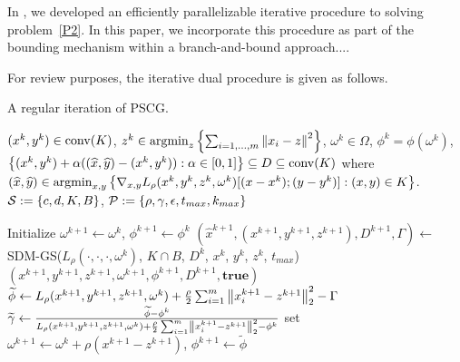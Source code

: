 In \cite{previouspaper}, we developed an efficiently parallelizable iterative procedure to solving problem~\eqref{P2}. 
In this paper, we incorporate this procedure as part of the bounding mechanism within a branch-and-bound approach....

For review purposes, the iterative dual procedure is given as follows.

\begin{algorithm}[H]
\caption{A regular iteration of PSCG.\label{AlgDualAscentGSSSC}}
\begin{algorithmic}
\State \quad\quad$(x^k,y^k) \in \operatorname{conv}(K)$, $z^k \in \operatorname*{argmin}_z \left\{ \sum_{i=1,\dots,m}\left \| x_i-z \right \|^2 \right \}$, $\omega^k \in \Omega$, 
\State \quad\quad${\phi}^k = {\phi}(\omega^k)$, $\left\{ (x^k,y^k) + \alpha ((\widehat{x},\widehat{y}) - (x^k,y^k)) : \alpha \in [0,1] \right \} \subseteq {D} \subseteq \operatorname{conv}(K)$ where
\State \quad\quad\quad\quad$(\widehat{x},\widehat{y}) \in \operatorname*{argmin}_{x,y} \left\{ \nabla_{x,y} L_\rho(x^k,y^k,z^k,\omega^k) [(x - {x}^k);(y-y^k)] : (x,y) \in K \right \}$.
\State \quad\quad$\mathcal{S}:=\left\{ c,d,K,B \right \}$, $\mathcal{P}:=\left\{ \rho,\gamma, \epsilon, t_{max}, k_{max} \right \}$
\end{algorithmic}
\begin{algorithmic}[1]
       \State Initialize $\omega^{k+1} \gets \omega^{k}$, ${\phi}^{k+1} \gets {\phi}^{k}$ 
       \State $(\widehat{x}^{k+1},(x^{k+1},y^{k+1},z^{k+1}), D^{k+1},\Gamma) \gets$ SDM-GS($L_\rho(\cdot,\cdot,\cdot,\omega^k)$, $K \cap B$, $D^k$, $x^{k}$, $y^k$, $z^{k}$, $t_{max}$) \label{ReturnSDMGS}
        \label{Alg4BeginTermCond}
       	 $(x^{k+1},y^{k+1},z^{k+1},\omega^{k+1},{\phi}^{k+1}, D^{k+1}, \textbf{true})$
       \EndIf \label{Alg4EndTermCond}
       \State $\widetilde{\phi} \gets  L_{\rho}({x}^{k+1},y^{k+1},{z} ^{k+1},\omega^k) + \frac{\rho}{2} \sum_{i=1}^m\left \| {x}_i^{k+1}-{z}^{k+1} \right \|_2^2 - \Gamma$ \label{ComputePhiTilde}
       \State $\widetilde{\gamma} \gets \frac{\widetilde{\phi} - {\phi}^k}{L_\rho({x}^{k+1},y^{k+1},{z}^{k+1}, \omega^k) + \frac{\rho}{2} \sum_{i=1}^m\left \| {x}_i^{k+1}-{z} ^{k+1} \right \|_2^2-{\phi}^k}$ \label{ComputeCritVal}
       \If{$\widetilde{\gamma} \ge \gamma$} \label{Alg4LineSSC}
         \State set $\omega^{k+1} \gets \omega^{k} + \rho ({x}^{k+1}-{z}^{k+1})$, ${\phi}^{k+1} \gets \widetilde{\phi}$

\end{algorithmic}
\end{algorithm}
